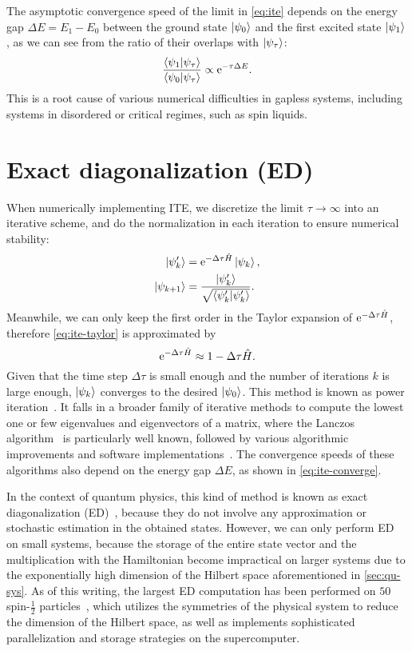 The asymptotic convergence speed of the limit in \cref{eq:ite} depends on the energy gap $\Delta E = E_1 - E_0$ between the ground state $\ket{\psi_0}$ and the first excited state $\ket{\psi_1}$, as we can see from the ratio of their overlaps with $\ket{\psi_\tau}$:
\begin{equation}
\frac{\ip{\psi_1}{\psi_\tau}}{\ip{\psi_0}{\psi_\tau}} \propto \rme^{-\tau \Delta E}. \label{eq:ite-converge}
\end{equation}
This is a root cause of various numerical difficulties in gapless systems, including systems in disordered or critical regimes, such as spin liquids.

\vfill

\section{Exact diagonalization (ED)}
\label{sec:ed}

When numerically implementing ITE, we discretize the limit $\tau \to \infty$ into an iterative scheme, and do the normalization in each iteration to ensure numerical stability:
\begin{align}
\ket{\psi'_k} &= \rme^{-\Delta \tau \hat{H}} \ket{\psi_k}, \\
\ket{\psi_{k + 1}} &= \frac{\ket{\psi'_k}}{\sqrt{\ip{\psi'_k}}}.
\end{align}
Meanwhile, we can only keep the first order in the Taylor expansion of $\mathrm{e}^{-\Delta \tau \hat{H}}$, therefore \cref{eq:ite-taylor} is approximated by
\begin{equation}
\mathrm{e}^{-\Delta \tau \hat{H}} \approx 1 - \Delta \tau \hat{H}.
\end{equation}
Given that the time step $\Delta \tau$ is small enough and the number of iterations $k$ is large enough, $\ket{\psi_k}$ converges to the desired $\ket{\psi_0}$. This method is known as power iteration~\cite{mises1929praktische}. It falls in a broader family of iterative methods to compute the lowest one or few eigenvalues and eigenvectors of a matrix, where the Lanczos algorithm~\cite{lanczos1950iteration} is particularly well known, followed by various algorithmic improvements and software implementations~\cite{knyazev2001toward, stathopoulos2010primme}. The convergence speeds of these algorithms also depend on the energy gap $\Delta E$, as shown in \cref{eq:ite-converge}.

In the context of quantum physics, this kind of method is known as exact diagonalization (ED)~\cite{weisse2008exact}, because they do not involve any approximation or stochastic estimation in the obtained states. However, we can only perform ED on small systems, because the storage of the entire state vector and the multiplication with the Hamiltonian become impractical on larger systems due to the exponentially high dimension of the Hilbert space aforementioned in \cref{sec:qu-sys}. As of this writing, the largest ED computation has been performed on $50$ spin-$\frac{1}{2}$ particles~\cite{wietek2018sublattice}, which utilizes the symmetries of the physical system to reduce the dimension of the Hilbert space, as well as implements sophisticated parallelization and storage strategies on the supercomputer.

